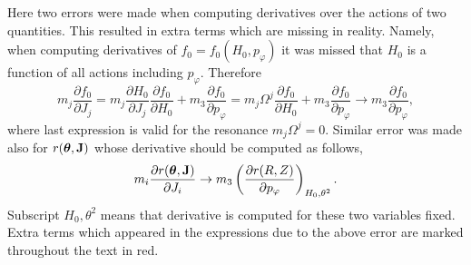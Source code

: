 \documentclass[preprint,prb,aps]{revtex4-1}
\newcommand{\difp}[2]{\frac{\partial #1}{\partial #2}}
\newcommand{\bJ}{{\bf J}}
\newcommand{\btheta}{{\boldsymbol\theta}}
\begin{document}
{\color{red} 
Here two errors were made when computing derivatives over the actions of two quantities.
This resulted in extra terms which are 
missing in reality. Namely, when computing derivatives of $f_0=f_0(H_0,p_\varphi)$ it was missed that $H_0$
is a function of all actions including $p_\varphi$. Therefore
$$
m_j\difp{f_0}{J_j}=m_j\difp{H_0}{J_j}\difp{f_0}{H_0}+m_3\difp{f_0}{p_\varphi}
=m_j\Omega^j\difp{f_0}{H_0}+m_3\difp{f_0}{p_\varphi} \rightarrow m_3\difp{f_0}{p_\varphi},
$$
where last expression is valid for the resonance $m_j\Omega^j=0$. Similar error was made also for $r(\btheta,\bJ)$ 
whose derivative should be computed as follows,
$$
m_i\difp{r(\btheta,\bJ)}{J_i} \rightarrow m_3\left(\difp{r(R,Z)}{p_\varphi}\right)_{H_0,\theta^2}.
$$
Subscript $H_0,\theta^2$ means that derivative is computed for these two variables fixed.
Extra terms which appeared in the expressions due to the above error are marked throughout the text in red.
}
\end{document}
